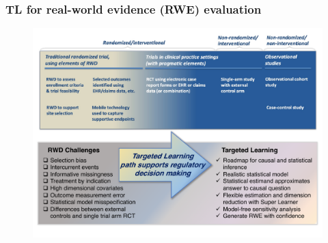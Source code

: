 \documentclass[t]{beamer}
\begin{document}
\begin{frame}
\frametitle{TL for real-world evidence (RWE) evaluation}
\vspace{-18pt}
\centering
\begin{figure}
\begin{center}
\includegraphics[width=1.02\textwidth]{figures/TLpath2_edit.pdf}
\end{center}
\end{figure}
\vspace{35pt}
\end{frame}
\end{document}
